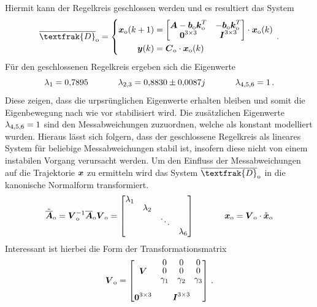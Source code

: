 Hiermit kann der Regelkreis geschlossen werden und es resultiert das System
\begin{equation}
\overline{\textfrak{D}}\idx{o} = \left\{ \begin{split}
\bs{x}\idx{o}(k+1) &= \begin{bmatrix}
\bs{A}-\bs{b}\idx{o}\bs{k}^T\idx{o} & -\bs{b}\idx{o}\bs{k}^T\idx{o} \\
\bs{0}^{3\times 3} & \bs{I}^{3\times 3}
\end{bmatrix}\cdot \bs{x}\idx{o}(k)
\\
\bs{y}(k) &= \bs{C}\idx{o}\cdot \bs{x}\idx{o}(k)
\end{split}\right.
\,.
\end{equation}
Für den geschlossenen Regelkreis ergeben sich die Eigenwerte
\begin{equation}
\lambda_{\text{1}} = 0{,}7895 \hspace{35pt} \lambda_{\text{2,3}} = 0{,}8830 \pm 0{,}0087j \hspace{35pt} \lambda_{\text{4,5,6}} = 1
\,.
\end{equation}
Diese zeigen, dass die urpsrünglichen Eigenwerte erhalten bleiben und somit die Eigenbewegung nach wie vor stabilisiert wird. Die zusätzlichen Eigenwerte $\lambda_{\text{4,5,6}}=1$ sind den Messabweichungen zuzuordnen, welche als konstant modelliert wurden. Hieraus lässt sich folgern, dass der geschlossene Regelkreis als lineares System für beliebige Messabweichungen stabil ist, insofern diese nicht von einem instabilen Vorgang verursacht werden. Um den Einfluss der Messabweichungen auf die Trajektorie $\boldsymbol{x}$ zu ermitteln wird das System $\overline{\textfrak{D}}\idx{o}$ in die kanonische Normalform transformiert.
\begin{equation}
\tilde{\overline{\bs{A}}}\idx{o} = \bs{V}^{-1}\idx{o}\overline{\bs{A}}\idx{o}\bs{V}\idx{o} = \begin{bmatrix}
\lambda\idx1 & & & \\
 & \lambda\idx2 & & \\
 & & \ddots & \\
 & & & \lambda\idx6
\end{bmatrix}
\hspace{35pt} 
\bs{x}\idx{o} = \bs{V}\idx{o}\cdot \tilde{\bs{x}}\idx{o}
\end{equation}
Interessant ist hierbei die Form der Transformationsmatrix
\begin{equation}
\renewcommand*{\arraystretch}{0.8}
\bs{V}\idx{o} = \begin{bmatrix}
\bs{V} & \begin{matrix} 0 & 0 & 0 \\ 0 & 0 & 0 \\ \gamma\idx1 & \gamma\idx2 & \gamma\idx3 \end{matrix} 
\\ \\
\bs{0}^{3\times 3} & \bs{I}^{3\times 3}
\end{bmatrix}
\,.
\end{equation}
